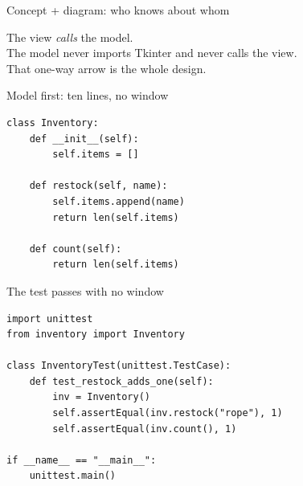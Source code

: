 \documentclass[aspectratio=169]{beamer}
\begin{document}
\begin{frame}{Concept + diagram: who knows about whom}
\conceptdiagramkicker
\begin{conceptdiagrambody}
  \begin{concepttext}
    The view \emph{calls} the model.\\[2mm]
    The model never imports Tkinter and never calls the view.\\[2mm]
    That one-way arrow is the whole design.
  \end{concepttext}
  \begin{conceptdiagram}
  \end{conceptdiagram}
\end{conceptdiagrambody}
\end{frame}

\begin{frame}[fragile]{Model first: ten lines, no window}
\codeframekicker
\begin{lstlisting}
class Inventory:
    def __init__(self):
        self.items = []

    def restock(self, name):
        self.items.append(name)
        return len(self.items)

    def count(self):
        return len(self.items)
\end{lstlisting}
\end{frame}

\begin{frame}[fragile]{The test passes with no window}
\codeframekicker
\begin{lstlisting}
import unittest
from inventory import Inventory

class InventoryTest(unittest.TestCase):
    def test_restock_adds_one(self):
        inv = Inventory()
        self.assertEqual(inv.restock("rope"), 1)
        self.assertEqual(inv.count(), 1)

if __name__ == "__main__":
    unittest.main()
\end{lstlisting}
\end{frame}
\end{document}
